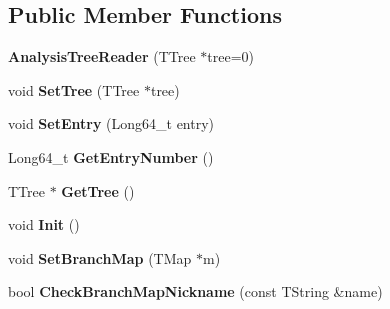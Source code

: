 \subsection*{Public Member Functions}
\begin{DoxyCompactItemize}
\item 
\hypertarget{class_h_a_l_1_1_analysis_tree_reader_ac00ba35d0b860566482e32c1dfd04827}{{\bfseries Analysis\+Tree\+Reader} (T\+Tree $\ast$tree=0)}\label{class_h_a_l_1_1_analysis_tree_reader_ac00ba35d0b860566482e32c1dfd04827}

\item 
\hypertarget{class_h_a_l_1_1_analysis_tree_reader_a031181c782d3620d271a92cef995d998}{void {\bfseries Set\+Tree} (T\+Tree $\ast$tree)}\label{class_h_a_l_1_1_analysis_tree_reader_a031181c782d3620d271a92cef995d998}

\item 
\hypertarget{class_h_a_l_1_1_analysis_tree_reader_a1a9c8bc30141df5fab1163f006fb08e3}{void {\bfseries Set\+Entry} (Long64\+\_\+t entry)}\label{class_h_a_l_1_1_analysis_tree_reader_a1a9c8bc30141df5fab1163f006fb08e3}

\item 
\hypertarget{class_h_a_l_1_1_analysis_tree_reader_a6fcf94a452ec53b66d9e0e49062d4e44}{Long64\+\_\+t {\bfseries Get\+Entry\+Number} ()}\label{class_h_a_l_1_1_analysis_tree_reader_a6fcf94a452ec53b66d9e0e49062d4e44}

\item 
\hypertarget{class_h_a_l_1_1_analysis_tree_reader_a6ad8933bd6c8cc2b17179c96fd3bfcb1}{T\+Tree $\ast$ {\bfseries Get\+Tree} ()}\label{class_h_a_l_1_1_analysis_tree_reader_a6ad8933bd6c8cc2b17179c96fd3bfcb1}

\item 
\hypertarget{class_h_a_l_1_1_analysis_tree_reader_ab17ea6c10da56d9282d60d9507e01ef9}{void {\bfseries Init} ()}\label{class_h_a_l_1_1_analysis_tree_reader_ab17ea6c10da56d9282d60d9507e01ef9}

\item 
\hypertarget{class_h_a_l_1_1_analysis_tree_reader_ae3dcc57b2cc27431e89edd341b300eb6}{void {\bfseries Set\+Branch\+Map} (T\+Map $\ast$m)}\label{class_h_a_l_1_1_analysis_tree_reader_ae3dcc57b2cc27431e89edd341b300eb6}

\item 
\hypertarget{class_h_a_l_1_1_analysis_tree_reader_afa371719adcfa583fe29ea0f468b9ea8}{bool {\bfseries Check\+Branch\+Map\+Nickname} (const T\+String \&name)}\label{class_h_a_l_1_1_analysis_tree_reader_afa371719adcfa583fe29ea0f468b9ea8}


\end{DoxyCompactItemize}
